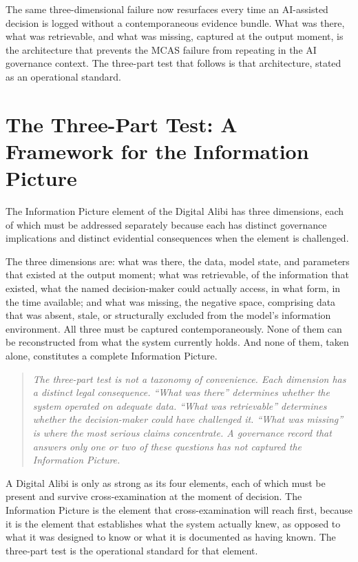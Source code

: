 The same three-dimensional failure now resurfaces every time an AI-assisted decision is logged without a contemporaneous evidence bundle. What was there, what was retrievable, and what was missing, captured at the output moment, is the architecture that prevents the MCAS failure from repeating in the AI governance context. The three-part test that follows is that architecture, stated as an operational standard.

\scenebreak

\section{The Three-Part Test: A Framework for the Information Picture}

The Information Picture element of the Digital Alibi has three dimensions, each of which must be addressed separately because each has distinct governance implications and distinct evidential consequences when the element is challenged.

The three dimensions are: what was there, the data, model state, and parameters that existed at the output moment; what was retrievable, of the information that existed, what the named decision-maker could actually access, in what form, in the time available; and what was missing, the negative space, comprising data that was absent, stale, or structurally excluded from the model's information environment. All three must be captured contemporaneously. None of them can be reconstructed from what the system currently holds. And none of them, taken alone, constitutes a complete Information Picture.

\begin{quote}
\emph{The three-part test is not a taxonomy of convenience. Each dimension has a distinct legal consequence. ``What was there'' determines whether the system operated on adequate data. ``What was retrievable'' determines whether the decision-maker could have challenged it. ``What was missing'' is where the most serious claims concentrate. A governance record that answers only one or two of these questions has not captured the Information Picture.}
\end{quote}

A Digital Alibi is only as strong as its four elements, each of which must be present and survive cross-examination at the moment of decision. The Information Picture is the element that cross-examination will reach first, because it is the element that establishes what the system actually knew, as opposed to what it was designed to know or what it is documented as having known. The three-part test is the operational standard for that element.

